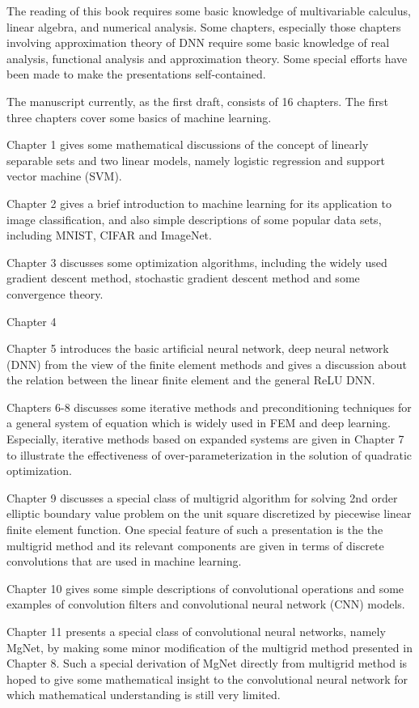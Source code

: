 The reading of this book requires some basic knowledge of
multivariable calculus, linear algebra, and numerical analysis.  Some
chapters, especially those chapters involving approximation theory of
DNN require some basic knowledge of real analysis, functional analysis
and approximation theory.  Some special efforts have been made to make
the presentations self-contained. 

The manuscript currently, as the first draft, consists of 16
chapters.   The first three chapters cover some basics of machine
learning. 

Chapter 1 gives some mathematical discussions of the concept of
linearly separable sets and two linear models, namely logistic
regression and support vector machine (SVM).

Chapter 2  gives a brief introduction to machine learning for its
application to image classification, and also simple
descriptions of some popular data sets, including MNIST, CIFAR and
ImageNet.  

Chapter 3 discusses some optimization algorithms, including the widely
used gradient descent method, stochastic gradient descent method and
some convergence theory.

Chapter 4


Chapter 5 introduces the basic artificial neural network, deep neural
network (DNN) from the view of the finite element methods and gives a
discussion about the relation between the linear finite element and
the general ReLU DNN.

Chapters 6-8 discusses some iterative methods and
preconditioning techniques for a general system of equation which is
widely used in FEM and deep learning.  Especially, iterative methods
based on expanded systems are given in Chapter 7 to illustrate the
effectiveness of over-parameterization in the solution of quadratic
optimization. 

Chapter 9 discusses a special class of multigrid algorithm for solving
2nd order elliptic boundary value problem on the unit square
discretized by piecewise linear finite element function.  One special
feature of such a presentation is the the multigrid method and its
relevant components are given in terms of discrete convolutions that
are used in machine learning.

Chapter 10 gives some simple descriptions of  
convolutional operations and some examples of convolution filters and
convolutional neural network (CNN) models.

Chapter 11 presents a special class of convolutional neural networks, namely
MgNet, by making some minor modification of the multigrid method
presented in Chapter 8.  Such a special derivation of MgNet directly
from multigrid method is hoped to give some mathematical insight to
the convolutional neural network for which mathematical understanding
is still very limited.

